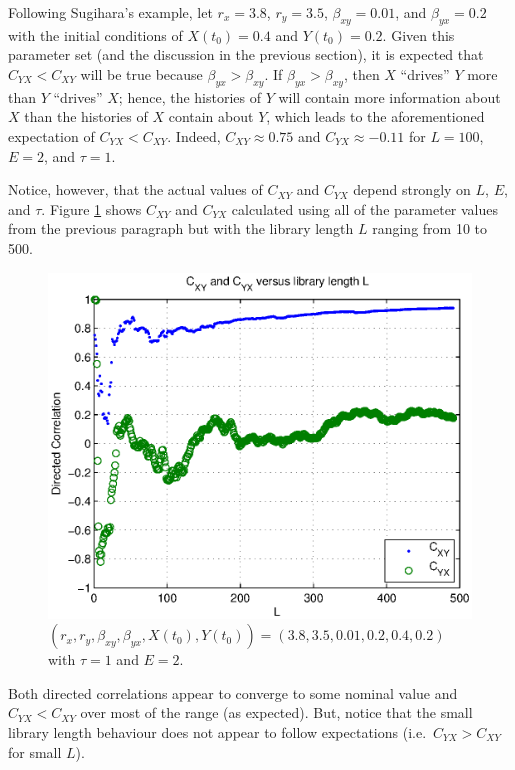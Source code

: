 \documentclass[a4paper,11pt]{article}
\begin{document}
Following Sugihara's example, let $r_x=3.8$, $r_y=3.5$, $\beta_{xy}=0.01$, and $\beta_{yx}=0.2$ with the initial conditions of $X(t_0) = 0.4$ and $Y(t_0)=0.2$.  Given this parameter set (and the discussion in the previous section), it is expected that $C_{YX}<C_{XY}$ will be true because $\beta_{yx}>\beta_{xy}$.  If $\beta_{yx}>\beta_{xy}$, then $X$ ``drives'' $Y$ more than $Y$ ``drives'' $X$; hence, the histories of $Y$ will contain more information about $X$ than the histories of $X$ contain about $Y$, which leads to the aforementioned expectation of $C_{YX}<C_{XY}$.  Indeed, $C_{XY}\approx 0.75$ and $C_{YX}\approx -0.11$ for $L=100$, $E=2$, and $\tau = 1$.

Notice, however, that the actual values of $C_{XY}$ and $C_{YX}$ depend strongly on $L$, $E$, and $\tau$.  Figure \ref{fig:CxyCyxVL} shows $C_{XY}$ and $C_{YX}$ calculated using all of the parameter values from the previous paragraph but with the library length $L$ ranging from 10 to 500.
\begin{figure}[h!t]
\centering
\label{fig:CxyCyxVL}
\includegraphics[scale=0.55]{CxyCyxVL.eps}
\caption{$\left(r_x,r_y,\beta_{xy},\beta_{yx},X(t_0),Y(t_0)\right) = \left(3.8,3.5,0.01,0.2,0.4,0.2\right)$ with $\tau=1$ and $E=2$.}
\end{figure}
Both directed correlations appear to converge to some nominal value and $C_{YX}<C_{XY}$ over most of the range (as expected).  But, notice that the small library length behaviour does not appear to follow expectations (i.e.\ $C_{YX}>C_{XY}$ for small $L$).
\end{document}
